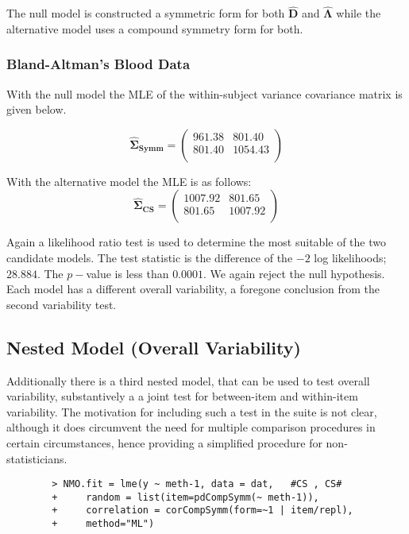 \documentclass[12pt, a4paper]{report}
\theoremstyle{plain}
\theoremstyle{definition}
\theoremstyle{remark}
\begin{document}
	The null model is constructed a symmetric form for both $\boldsymbol{\hat{D}}$ and $\boldsymbol{\hat{\Lambda}}$ while the alternative model uses a compound symmetry form for both.
	
	\subsubsection{Bland-Altman's Blood Data}
	With the null model the MLE of the within-subject variance covariance matrix is given below.
	
	\begin{equation}
	\boldsymbol{\hat{\Sigma}_{Symm}} = \left( \begin{array}{cc}
	961.38 & 801.40  \\
	801.40 & 1054.43  \\
	\end{array}\right)
	\end{equation}
	
	With the alternative model the MLE is as follows:
	\begin{equation}
	\boldsymbol{\hat{\Sigma}_{CS}} = \left( \begin{array}{cc}
	1007.92  & 801.65  \\
	801.65  & 1007.92  \\
	\end{array}\right)
	\end{equation}
	
	Again a likelihood ratio test is used to determine the most suitable of the two candidate models.
	The test statistic is the difference of the $-2$ log likelihoods; $28.884$. The $p-$value is less than $0.0001$. We again reject the null hypothesis. Each model has a different overall variability, a foregone conclusion from the second variability test.
	
	
	
	\subsection{Nested Model (Overall Variability)}
	Additionally there is a third nested model, that can be used to test overall variability, substantively a a joint test for between-item and within-item variability. The motivation for including such a test in the suite is not clear, although it does circumvent the need for multiple comparison procedures in certain circumstances, hence providing a simplified procedure for non-statisticians.
	
	\begin{framed}
		\begin{verbatim}
		> NMO.fit = lme(y ~ meth-1, data = dat,   #CS , CS# 
		+     random = list(item=pdCompSymm(~ meth-1)), 
		+     correlation = corCompSymm(form=~1 | item/repl), 
		+     method="ML")
		\end{verbatim}
	\end{framed}
\end{document}
